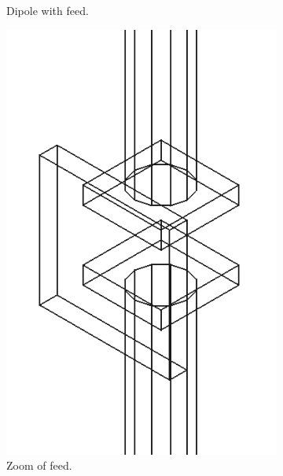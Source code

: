 \documentclass[titlepage]{article}
\renewcommand\_{\textunderscore\linebreak[1]}
\begin{document}
\begin{figure}[H]
\begin{subfigure}[t]{0.0125\textwidth}
     \caption{Dipole with feed.}
  \end{subfigure}
  \hspace{1cm}
  \begin{subfigure}[t]{0.2\textwidth}
     \includegraphics[width=1\linewidth]{../regression/OpenParEM3D/antenna/dipole_study/screenshots/dipole_feed}
     \caption{Zoom of feed.}
  \end{subfigure}
  \hspace{1cm}
  \begin{subfigure}[t]{0.32\textwidth}

\end{subfigure}
\end{figure}
\end{document}

